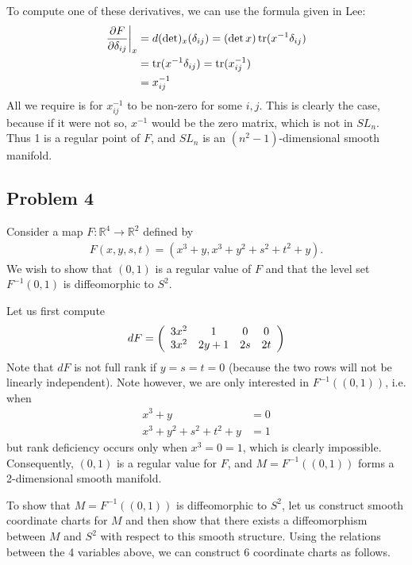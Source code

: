\documentclass{../../mathnotes}
\begin{document}
To compute one of these derivatives, we can use the formula given in Lee:
\begin{align*}
    \frac{\partial F}{\partial\delta_{ij}}\bigg|_x&=d(\det)_x(\delta_{ij})=(\det x)\operatorname{tr}(x^{-1}\delta_{ij})\\
    &=\operatorname{tr}(x^{-1}\delta_{ij})=\operatorname{tr}(x^{-1}_{ij})\\
    &=x^{-1}_{ij}
\end{align*}
All we require is for $x^{-1}_{ij}$ to be non-zero for some $i,j$. This is clearly the case, because if it were not so, $x^{-1}$ would be the zero matrix,
which is not in $SL_n$. Thus 1 is a regular point of $F$, and $SL_n$ is an $(n^2-1)$-dimensional smooth manifold.

\subsection*{Problem 4}

Consider a map $F:\mathbb{R}^4\to\mathbb{R}^2$ defined by
\begin{align*}
    F(x,y,s,t)=(x^3+y,x^3+y^2+s^2+t^2+y).
\end{align*}
We wish to show that $(0,1)$ is a regular value of $F$ and that the level set $F^{-1}\left( 0,1 \right)$ is diffeomorphic to $S^2$.

Let us first compute
\begin{align*}
    dF=\left( 
    \begin{array}[]{cccc}
        3x^2 & 1 & 0 & 0\\
        3x^2 & 2y+1 & 2s & 2t
    \end{array}
    \right)
\end{align*}
Note that $dF$ is not full rank if $y=s=t=0$ (because the two rows will not be linearly independent). Note however, we are only interested in
$F^{-1}((0,1))$, i.e. when
\begin{align*}
    x^3+y&=0\\
    x^3+y^2+s^2+t^2+y&=1
\end{align*}
but rank deficiency occurs only when $x^3=0=1$, which is clearly impossible. Consequently, $(0,1)$ is a regular value for $F$,
and $M=F^{-1}( (0,1) )$ forms a 2-dimensional smooth manifold.

To show that $M=F^{-1}((0,1))$ is diffeomorphic to $S^2$, let us construct smooth coordinate charts for $M$ and then show that there exists
a diffeomorphism between $M$ and $S^2$ with respect to this smooth structure. Using the relations between the 4 variables above, we can construct
6 coordinate charts as follows.
\end{document}
